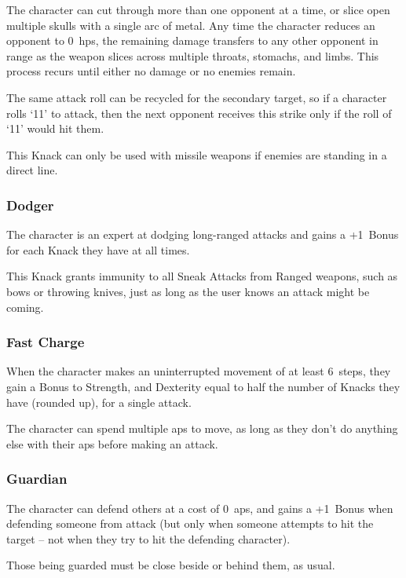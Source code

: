 \begin{multicols}{2}
The character can cut through more than one opponent at a time, or slice open multiple skulls with a single arc of metal.
Any time the character reduces an opponent to 0~\glspl{hp}, the remaining damage transfers to any other opponent in range as the weapon slices across multiple throats, stomachs, and limbs.
This process recurs until either no damage or no enemies remain.

The same attack roll can be recycled for the secondary target, so if a character rolls `11' to attack, then the next opponent receives this strike only if the roll of `11' would hit them.

This Knack can only be used with missile weapons if enemies are standing in a direct line.

\subsubsection{Dodger}
\label{dodger}

The character is an expert at dodging long-ranged attacks and gains a +1~Bonus for each Knack they have at all times.

This Knack grants immunity to all Sneak Attacks from Ranged weapons, such as bows or throwing knives, just as long as the user knows an attack might be coming.

\subsubsection{Fast Charge}

When the character makes an uninterrupted movement of at least 6~\glspl{step}, they gain a Bonus to Strength, and Dexterity equal to half the number of Knacks they have (rounded up), for a single attack.

The character can spend multiple \glspl{ap} to move, as long as they don't do anything else with their \glspl{ap} before making an attack.

\subsubsection{Guardian}

The character can defend others at a cost of 0~\glspl{ap}, and gains a +1~Bonus when defending someone from attack (but only when someone attempts to hit the target -- not when they try to hit the defending character).

Those being guarded must be close beside or behind them, as usual.


\end{multicols}
